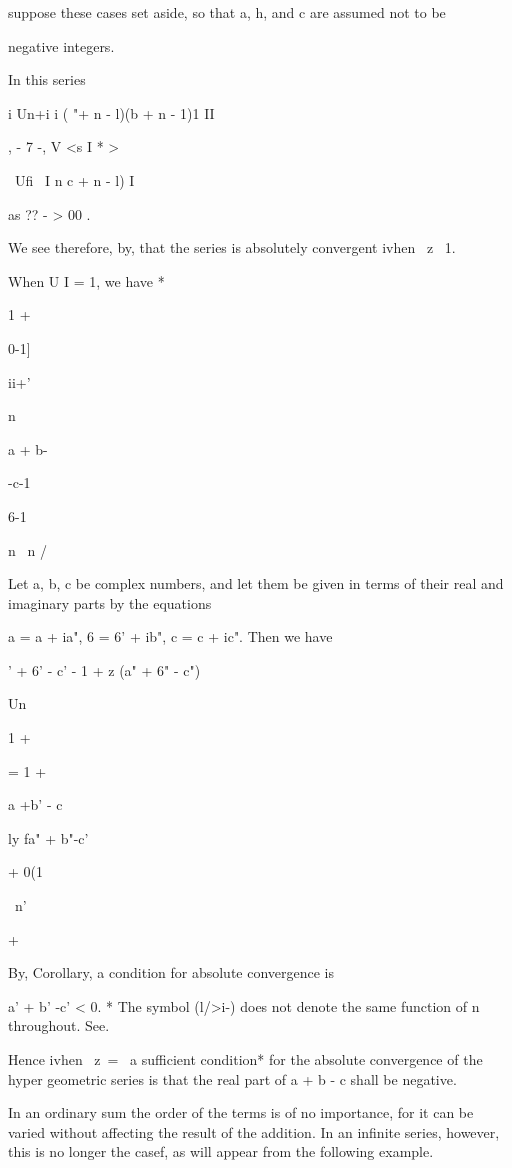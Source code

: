 suppose these cases set aside, so that a, h, and c are assumed not to
be

negative integers.

  In this series

i Un+i i ( "+ n - l)(b + n - 1)1 II

, - 7 -, V <s I * >

\ Ufi \ I n c + n - l) I

as ?? - > 00 .

We see therefore, by, that the series is absolutely convergent
ivhen \ z\ < l, and divergent ivhen | | > 1.

When U I = 1, we have *

1 +

0-1]

ii+'

n

a + b-

-c-1

6-1

n \ n /

Let a, b, c be complex numbers, and let them be given in terms of
their real and imaginary parts by the equations

a = a + ia", 6 = 6' + ib", c = c + ic". Then we have

 ' + 6' - c' - 1 + z (a" + 6" - c")

Un

1 +

= 1 +

a +b' - c

ly fa" + b"-c'

+ 0(1

\ n'

+

  

By, Corollary, a condition for absolute convergence is

a' + b' -c' < 0. * The symbol (l/>i-) does not denote the same
function of n throughout. See.

%
%

Hence ivhen \ z\ = \, a sufficient condition* for the absolute
convergence of the hyper geometric series is that the real part of a +
b - c shall be negative.


In an ordinary sum the order of the terms is of no importance, for it
can be varied without affecting the result of the addition. In an
infinite series, however, this is no longer the casef, as will appear
from the following example.

